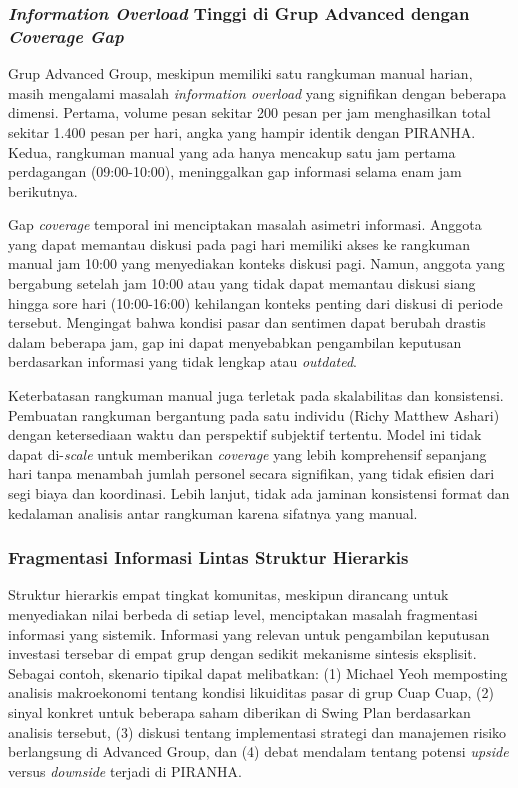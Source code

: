 \subsubsection{\textit{Information Overload} Tinggi di Grup Advanced dengan \textit{Coverage Gap}}

Grup Advanced Group, meskipun memiliki satu rangkuman manual harian, masih mengalami masalah \textit{information overload} yang signifikan dengan beberapa dimensi. Pertama, volume pesan sekitar 200 pesan per jam menghasilkan total sekitar 1.400 pesan per hari, angka yang hampir identik dengan PIRANHA. Kedua, rangkuman manual yang ada hanya mencakup satu jam pertama perdagangan (09:00-10:00), meninggalkan gap informasi selama enam jam berikutnya.

Gap \textit{coverage} temporal ini menciptakan masalah asimetri informasi. Anggota yang dapat memantau diskusi pada pagi hari memiliki akses ke rangkuman manual jam 10:00 yang menyediakan konteks diskusi pagi. Namun, anggota yang bergabung setelah jam 10:00 atau yang tidak dapat memantau diskusi siang hingga sore hari (10:00-16:00) kehilangan konteks penting dari diskusi di periode tersebut. Mengingat bahwa kondisi pasar dan sentimen dapat berubah drastis dalam beberapa jam, gap ini dapat menyebabkan pengambilan keputusan berdasarkan informasi yang tidak lengkap atau \textit{outdated}.

Keterbatasan rangkuman manual juga terletak pada skalabilitas dan konsistensi. Pembuatan rangkuman bergantung pada satu individu (Richy Matthew Ashari) dengan ketersediaan waktu dan perspektif subjektif tertentu. Model ini tidak dapat di-\textit{scale} untuk memberikan \textit{coverage} yang lebih komprehensif sepanjang hari tanpa menambah jumlah personel secara signifikan, yang tidak efisien dari segi biaya dan koordinasi. Lebih lanjut, tidak ada jaminan konsistensi format dan kedalaman analisis antar rangkuman karena sifatnya yang manual.

\subsubsection{Fragmentasi Informasi Lintas Struktur Hierarkis}

Struktur hierarkis empat tingkat komunitas, meskipun dirancang untuk menyediakan nilai berbeda di setiap level, menciptakan masalah fragmentasi informasi yang sistemik. Informasi yang relevan untuk pengambilan keputusan investasi tersebar di empat grup dengan sedikit mekanisme sintesis eksplisit. Sebagai contoh, skenario tipikal dapat melibatkan: (1) Michael Yeoh memposting analisis makroekonomi tentang kondisi likuiditas pasar di grup Cuap Cuap, (2) sinyal konkret untuk beberapa saham diberikan di Swing Plan berdasarkan analisis tersebut, (3) diskusi tentang implementasi strategi dan manajemen risiko berlangsung di Advanced Group, dan (4) debat mendalam tentang potensi \textit{upside} versus \textit{downside} terjadi di PIRANHA.

